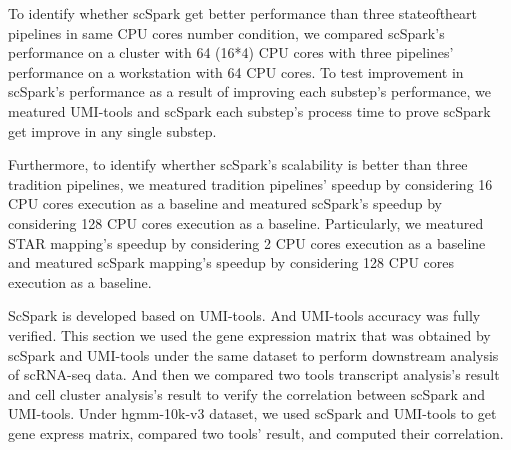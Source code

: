 \documentclass[conference]{IEEEtran}
\begin{document}
To identify whether scSpark get better performance than three state\-of\-the\-art pipelines in same CPU cores number condition,
we compared scSpark's performance on a cluster with 64 (16*4) CPU cores with three pipelines' performance on a workstation with 64 CPU cores.
To test improvement in scSpark's performance as a result of improving each substep's performance,
we meatured UMI-tools and scSpark each substep's process time to prove scSpark get improve in any single substep.

Furthermore, to identify wherther scSpark's scalability is better than three tradition pipelines, 
we meatured tradition pipelines' speedup by considering 16 CPU cores execution as a baseline and meatured scSpark's speedup by considering 128 CPU cores execution as a baseline.
Particularly, we meatured STAR mapping's speedup by considering 2 CPU cores execution as a baseline and meatured scSpark mapping's speedup by considering 128 CPU cores execution as a baseline.

ScSpark is developed based on UMI-tools. 
And UMI-tools accuracy was fully verified. 
This section we used the gene expression matrix that was obtained by scSpark and UMI-tools under the same dataset to perform downstream analysis of scRNA-seq data. 
And then we compared two tools transcript analysis's result and cell cluster analysis's result to verify the correlation between scSpark and UMI-tools. 
Under hgmm-10k-v3 dataset, we used scSpark and UMI-tools to get gene express matrix, compared two tools' result, and computed their correlation.
\end{document}
